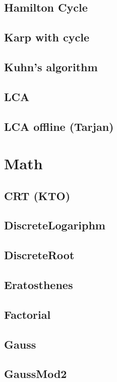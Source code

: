 \subsection{Hamilton Cycle}

\subsection{Karp with cycle}

\subsection{Kuhn's algorithm}

\subsection{LCA}

\subsection{LCA offline (Tarjan)}



\section{Math}

\subsection{CRT (KTO)}

\subsection{DiscreteLogariphm}

\subsection{DiscreteRoot}

\subsection{Eratosthenes}

\subsection{Factorial}

\subsection{Gauss}

\subsection{GaussMod2}

